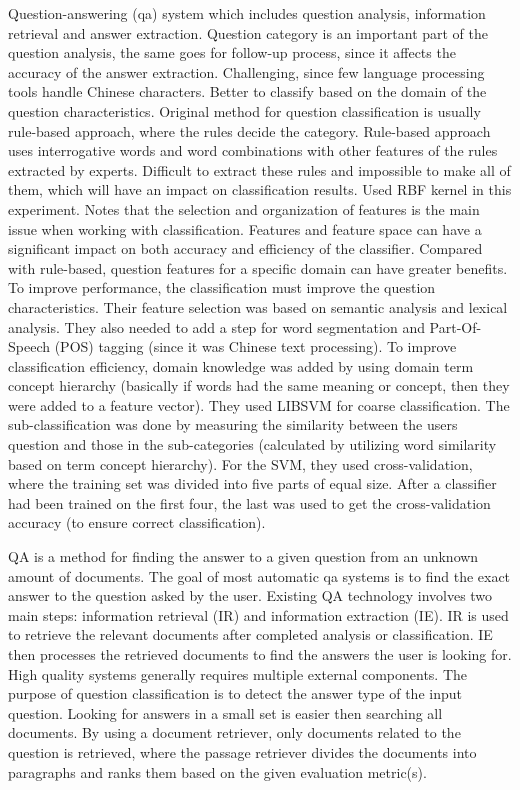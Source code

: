 Question-answering (qa) system which includes question analysis, information retrieval and answer extraction.  Question category is an important part of the question analysis, the same goes for follow-up process, since it affects the accuracy of the answer extraction. Challenging, since few language processing tools handle Chinese characters.  Better to classify based on the domain of the question characteristics. 
Original method for question classification is usually rule-based approach, where the rules decide the category. Rule-based approach uses interrogative words and word combinations with other features of the rules extracted by experts. Difficult to extract these rules and impossible to make all of them, which will have an impact on classification results. Used RBF kernel in this experiment. Notes that the selection and organization of features is the main issue when working with classification. Features and feature space can have a significant impact on both accuracy and efficiency of the classifier. Compared with rule-based, question features for a specific domain can have greater benefits. To improve performance, the classification must improve the question characteristics. Their feature selection was based on semantic analysis and lexical analysis. They also needed to add a step for word segmentation and Part-Of-Speech (POS) tagging (since it was Chinese text processing). To improve classification efficiency, domain knowledge was added by using domain term concept hierarchy (basically if words had the same meaning or concept, then they were added to a feature vector). They used LIBSVM for coarse classification. The sub-classification was done by measuring the similarity between the users question and those in the sub-categories  (calculated by utilizing word similarity based on term concept hierarchy). For the SVM, they used cross-validation, where the training set was divided into five parts of equal size. After a classifier had been trained on the first four, the last was used to get the cross-validation accuracy (to ensure correct classification).
\cite{Xu2012}

QA is a method for finding the answer to a given question from an unknown amount of documents. The goal of most automatic qa systems is to find the exact answer to the question asked by the user. 
Existing QA technology involves two main steps: information retrieval (IR) and information extraction (IE). IR is used to retrieve the relevant documents after completed analysis or classification. IE then processes  the retrieved documents to find the answers the user is looking for. High quality systems generally requires multiple external components.
The purpose of question classification is to detect the answer type of the input question. 
Looking for answers in a small set is easier then searching all documents. By using a document retriever,  only documents related to the question is retrieved, where the passage retriever divides the documents into paragraphs and ranks them based on the given evaluation metric(s).
\cite{Yen2013}

